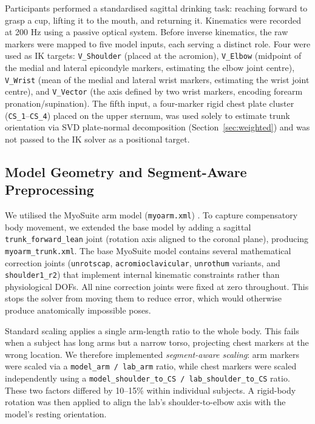 \documentclass[12pt, a4paper]{elsarticle}
\begin{document}
Participants performed a standardised sagittal drinking task: reaching forward to grasp a cup, lifting it to the mouth, and returning it. Kinematics were recorded at 200 Hz using a passive optical system. Before inverse kinematics, the raw markers were mapped to five model inputs, each serving a distinct role. Four were used as IK targets: \texttt{V\_Shoulder} (placed at the acromion), \texttt{V\_Elbow} (midpoint of the medial and lateral epicondyle markers, estimating the elbow joint centre), \texttt{V\_Wrist} (mean of the medial and lateral wrist markers, estimating the wrist joint centre), and \texttt{V\_Vector} (the axis defined by two wrist markers, encoding forearm pronation/supination). The fifth input, a four-marker rigid chest plate cluster (\texttt{CS\_1}–\texttt{CS\_4}) placed on the upper sternum, was used solely to estimate trunk orientation via SVD plate-normal decomposition (Section~\ref{sec:weighted}) and was not passed to the IK solver as a positional target.

\subsection{Model Geometry and Segment-Aware Preprocessing}
We utilised the MyoSuite arm model (\texttt{myoarm.xml}) \cite{caggiano2022}. To capture compensatory body movement, we extended the base model by adding a sagittal \texttt{trunk\_forward\_lean} joint (rotation axis aligned to the coronal plane), producing \texttt{myoarm\_trunk.xml}. The base MyoSuite model contains several mathematical correction joints (\texttt{unrotscap}, \texttt{acromioclavicular}, \texttt{unrothum} variants, and \texttt{shoulder1\_r2}) that implement internal kinematic constraints rather than physiological DOFs. All nine correction joints were fixed at zero throughout. This stops the solver from moving them to reduce error, which would otherwise produce anatomically impossible poses.

Standard scaling applies a single arm-length ratio to the whole body. This fails when a subject has long arms but a narrow torso, projecting chest markers at the wrong location. We therefore implemented \textit{segment-aware scaling}: arm markers were scaled via a \texttt{model\_arm / lab\_arm} ratio, while chest markers were scaled independently using a \texttt{model\_shoulder\_to\_CS / lab\_shoulder\_to\_CS} ratio. These two factors differed by 10–15\% within individual subjects. A rigid-body rotation \cite{wahba1965} was then applied to align the lab's shoulder-to-elbow axis with the model's resting orientation.
\end{document}
